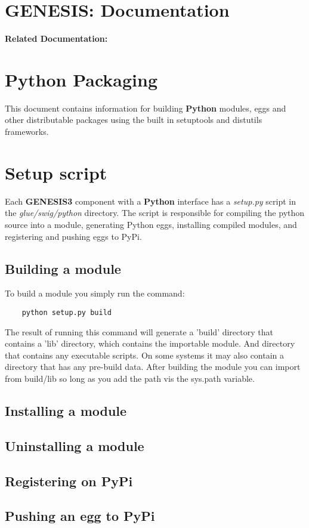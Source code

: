 \documentclass[12pt]{article}
\begin{document}
\section*{GENESIS: Documentation}

{\bf Related Documentation:}

\section*{Python Packaging}

This document contains information for building {\bf Python} modules, eggs and other distributable packages using the built in setuptools and distutils frameworks.  



\section*{Setup script}

	Each {\bf GENESIS3} component with a {\bf Python} interface has a {\it setup.py} script in the {\it glue/swig/python} directory. The script is responsible for compiling the python source into a module, generating Python eggs, installing compiled modules, and registering and pushing eggs to PyPi. 


\subsection*{Building a module}

	To build a module you simply run the command:
	
\begin{verbatim}
	python setup.py build
\end{verbatim}

The result of running this command will generate a 'build' directory that contains a 'lib' directory, which contains the importable module. And directory that contains any executable scripts. On some systems it may also contain a directory that has any pre-build data. After building the module you can import from build/lib so long as you add the path vis the sys.path variable. 



\subsection*{Installing a module}


\subsection*{Uninstalling a module}


\subsection*{Registering on PyPi}


\subsection*{Pushing an egg to PyPi}
\end{document}
